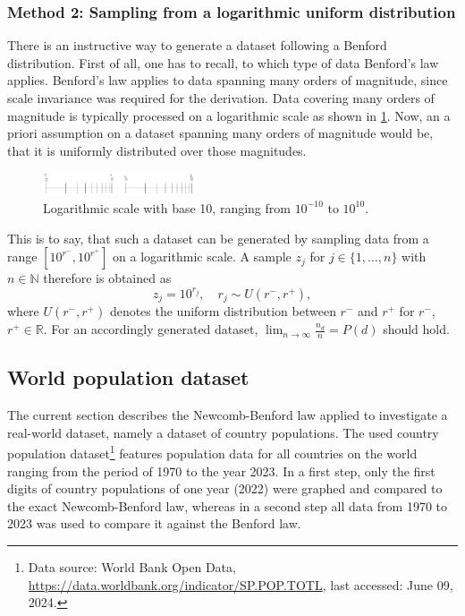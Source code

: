 \documentclass[a4paper,10pt, twocolumn]{article}
\begin{document}
\subsubsection{Method 2: Sampling from a logarithmic uniform distribution}
There is an instructive way to generate a dataset following a Benford distribution. First of all, one has to recall, to which type of data Benford's law applies. Benford's law applies to data spanning many orders of magnitude, since scale invariance was required for the derivation. Data covering many orders of magnitude is typically processed on a logarithmic scale as shown in \cref{fig:logarithmicscale}. Now, an a priori assumption on a dataset spanning many orders of magnitude would be, that it is uniformly distributed over those magnitudes.
\begin{figure}[h]
	\centering
	\includegraphics[width=0.4\textwidth]{figures/logarithmicscale.pdf}
	\caption{Logarithmic scale with base 10, ranging from $10^{-10}$ to $10^{10}$.}
	\label{fig:logarithmicscale}
\end{figure}
This is to say, that such a dataset can be generated by sampling data from a range $[10^{r^-}, 10^{r^+}]$ on a logarithmic scale. A sample $z_j$ for $j \in \{1,\dots,n\}$ with $n \in \mathbb{N}$ therefore is obtained as \begin{equation}\label{eq:gensamples}
	z_j = 10^{r_j}, \quad r_j \sim U(r^-,r^+),
\end{equation} where $U(r^-,r^+)$ denotes the uniform distribution between $r
^-$ and $r^+$ for $r^-$, $r^+ \in \mathbb{R}$. For an accordingly generated dataset, $\lim_{n\rightarrow \infty} \frac{n_d}{n} = P(d)$ should hold.

\subsection{World population dataset}
The current section describes the Newcomb-Benford law applied to investigate a real-world dataset, namely a dataset of country populations. The used country population dataset\footnote{Data source: World Bank Open Data, \url{https://data.worldbank.org/indicator/SP.POP.TOTL}, last accessed: June 09, 2024.} features population data for all countries on the world ranging from the period of 1970 to the year 2023. In a first step, only the first digits of country populations of one year (2022) were graphed and compared to the exact Newcomb-Benford law, whereas in a second step all data from 1970 to 2023 was used to compare it against the Benford law.
\end{document}
